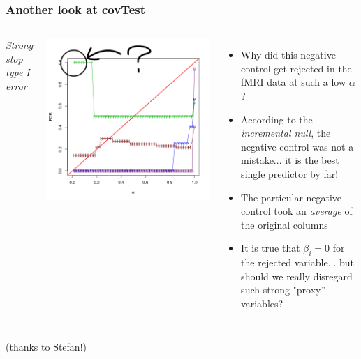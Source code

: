 \documentclass{beamer}
\begin{document}
\begin{frame}
\frametitle{Another look at covTest}
 \begin{columns}[c]
     \emph{Strong stop type I error}

     \includegraphics[scale = 0.4]{res_c_ss_type1_comment.png}
     \begin{itemize}
       \item<1> Why did this negative control get rejected in the fMRI data at such a low $\alpha$?
       \item<2> According to the \emph{incremental null}, the negative control was not a mistake... it is the best single predictor by far!
       \item<2> The particular negative control took an \emph{average} of the original columns 
       \item<3> It is true that $\beta_i = 0$ for the rejected variable... but should we really disregard such strong "proxy'' variables?
     \end{itemize}
 \end{columns}
(thanks to Stefan!)
\end{frame}
\end{document}
